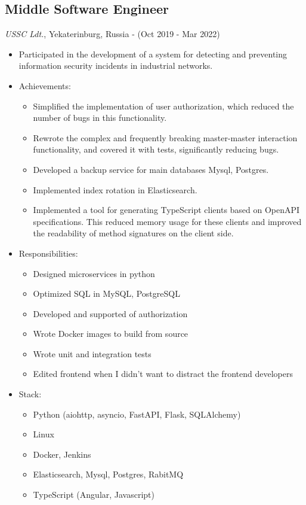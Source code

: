 \documentclass{article}
\begin{document}
\subsection*{Middle Software Engineer}
\textit{USSC Ldt.}, Yekaterinburg, Russia - (Oct 2019 - Mar 2022)
\begin{itemize}
    \item Participated in the development of a system for detecting and preventing information security incidents in industrial networks.
    \item Achievements:
    \begin{itemize}
        \item Simplified the implementation of user authorization, which reduced the number of bugs in this functionality.
        \item Rewrote the complex and frequently breaking master-master interaction functionality, and covered it with tests, significantly reducing bugs.
        \item Developed a backup service for main databases Mysql, Postgres.
        \item Implemented index rotation in Elasticsearch.
        \item Implemented a tool for generating TypeScript clients based on OpenAPI specifications. This reduced memory usage for these clients and improved the readability of method signatures on the client side.
    \end{itemize}
    \item Responsibilities:
    \begin{itemize}
        \item Designed microservices in python
        \item Optimized SQL in MySQL, PostgreSQL
        \item Developed and supported of authorization
        \item Wrote Docker images to build from source
        \item Wrote unit and integration tests
        \item Edited frontend when I didn't want to distract the frontend developers
    \end{itemize}
    \item Stack:
    \begin{itemize}
        \item Python (aiohttp, asyncio, FastAPI, Flask, SQLAlchemy)
        \item Linux
        \item Docker, Jenkins
        \item Elasticsearch, Mysql, Postgres, RabitMQ
        \item TypeScript (Angular, Javascript)
    \end{itemize}
\end{itemize}
\end{document}
